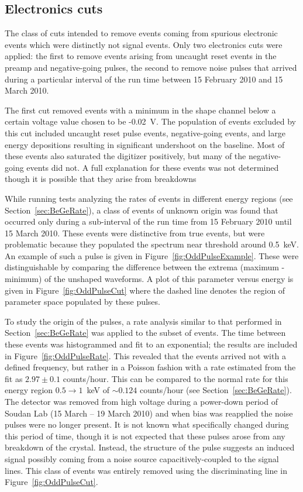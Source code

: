 	
		\subsection{Electronics cuts}
		\label{sec:BeGeElecCuts}
	
	The class of cuts intended to remove events coming from spurious electronic events which were distinctly not signal events.  Only two electronics cuts were applied: the first to remove events arising from uncaught reset events in the preamp and negative-going pulses, the second to remove noise pulses that arrived during a particular interval of the run time between 15 February 2010 and 15 March 2010.  
	
	The first cut removed events with a minimum in the shape channel below a certain voltage value chosen to be -0.02~V.  The population of events excluded by this cut included uncaught reset pulse events, negative-going events, and large energy depositions resulting in significant undershoot on the baseline.  Most of these events also saturated the digitizer positively, but many of the negative-going events did not.  A full explanation for these events was not determined though it is possible that they arise from breakdowns 
	
	While running tests analyzing the rates of events in different energy regions (see Section~\ref{sec:BeGeRate}), a class of events of unknown origin was found that occurred only during a sub-interval of the run time from 15 February 2010 until 15 March 2010.  These events were distinctive from true events, but were problematic because they populated the spectrum near threshold around 0.5~keV.   An example of such a pulse is given in Figure~\ref{fig:OddPulseExample}.  These were distinguishable by comparing the difference between the extrema (maximum - minimum) of the unshaped waveforms.  A plot of this parameter versus energy is given in Figure~\ref{fig:OddPulseCut} where the dashed line denotes the region of parameter space populated by these pulses.  
	
	To study the origin of the pulses, a rate analysis similar to that performed in Section~\ref{sec:BeGeRate} was applied to the subset of events.  The time between these events was histogrammed and fit to an exponential; the results are included in Figure~\ref{fig:OddPulseRate}.  This revealed that the events arrived not with a defined frequency, but rather in a Poisson fashion with a rate estimated from the fit as $2.97 \pm 0.1$ counts/hour.  This can be compared to the normal rate for this energy region $0.5\to1$~keV of $\sim0.124$ counts/hour (see Section~\ref{sec:BeGeRate}).  The detector was removed from high voltage during a power-down period of Soudan Lab (15 March -- 19 March 2010) and when bias was reapplied the noise pulses were no longer present.  It is not known what specifically changed during this period of time, though it is not expected that these pulses arose from any breakdown of the crystal.  Instead, the structure of the pulse suggests an induced signal possibly coming from a noise source capacitively-coupled to the signal lines.  This class of events was entirely removed using the discriminating line in Figure~\ref{fig:OddPulseCut}.
	
